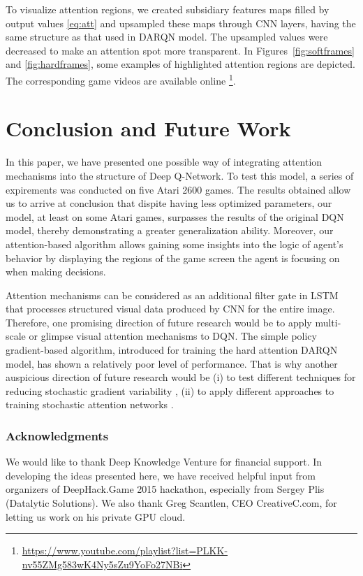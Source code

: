 \documentclass{article} \usepackage{nips15submit_e,times}
\begin{document}
To visualize attention regions, we created  subsidiary features maps  filled by output values \eqref{eq:att} and upsampled these maps through CNN layers, having the same structure as that used in DARQN model. The upsampled values were decreased to make an attention spot more transparent. In Figures~\ref{fig:softframes} and \ref{fig:hardframes}, some 
examples of highlighted attention regions are depicted. The corresponding game videos are available online \footnote{\url{https://www.youtube.com/playlist?list=PLKK-nv55ZMg583wK4Ny5sZu9YoFo27NBi}}.


\section{Conclusion and Future Work}
\label{sec:concl}

In this paper, we have presented one possible way of integrating attention mechanisms into the structure of Deep Q-Network. To test this model, a series of expirements was conducted on five Atari 2600 games. The results obtained allow us to arrive at conclusion that dispite having less optimized parameters, our model, at least on some Atari games, surpasses the results of the original DQN model, thereby demonstrating a greater generalization ability. Moreover, our attention-based algorithm allows gaining some insights into the logic of agent's behavior by displaying the regions of the game screen the agent is focusing on when making decisions.

Attention mechanisms can be considered as an additional filter gate in LSTM that processes structured visual data
produced by CNN for the entire image. Therefore, one promising direction of future research would be to apply multi-scale \cite{ba2015learning} or glimpse \cite{ba2015attention} visual attention mechanisms to DQN. The simple policy gradient-based algorithm, introduced for training the hard attention DARQN model, has shown a relatively poor level of performance. That is why another auspicious direction of future research would be (i) to test different techniques for reducing stochastic gradient variability \cite{schulman2015high}, (ii) to apply different approaches to training stochastic attention networks \cite{ba2015learning,schulman2015gradient}.

\subsubsection*{Acknowledgments}

We would like to thank Deep Knowledge Venture for financial support. In developing the ideas presented here, we have received helpful input from organizers of DeepHack.Game 2015 hackathon, especially from Sergey Plis (Datalytic Solutions). We also thank Greg Scantlen, CEO CreativeC.com, for letting us work on his private GPU cloud.

{}

\end{document}
